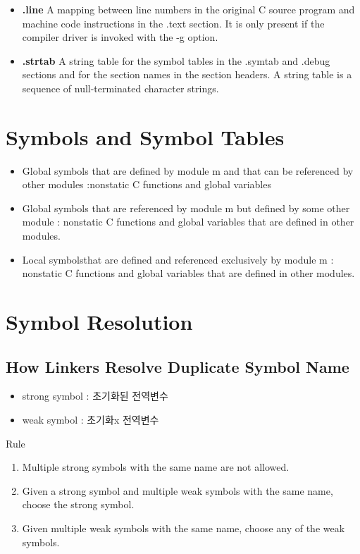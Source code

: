 \begin{itemize}
    \item \textbf{.line} A mapping between line numbers in the original C source program and machine code instructions in the .text section. It is only present if the compiler driver is invoked with the -g option.
    \item \textbf{.strtab} A string table for the symbol tables in the .symtab and .debug sections and for the section names in the section headers. A string table is a sequence of null-terminated character strings.
\end{itemize}
\section{Symbols and Symbol Tables}


\begin{itemize}
    \item Global symbols that are defined by module m and that can be referenced by other modules :nonstatic C functions and
    global variables
    \item Global symbols that are referenced by module m but defined by some other module : nonstatic C functions and global variables that are defined in other modules.
    \item Local symbolsthat are defined and referenced exclusively by module m : nonstatic C functions and global variables that are defined in other modules.
\end{itemize}

\section{Symbol Resolution}

\subsection{How Linkers Resolve Duplicate Symbol Name}

\begin{itemize}
    \item strong symbol : 초기화된 전역변수
    \item weak symbol : 초기화x 전역변수
\end{itemize}

Rule
\begin{enumerate}
    \item Multiple strong symbols with the same name are not allowed.
    \item Given a strong symbol and multiple weak symbols with the same name, choose the strong symbol.
    \item Given multiple weak symbols with the same name, choose any of the weak symbols.
\end{enumerate}

